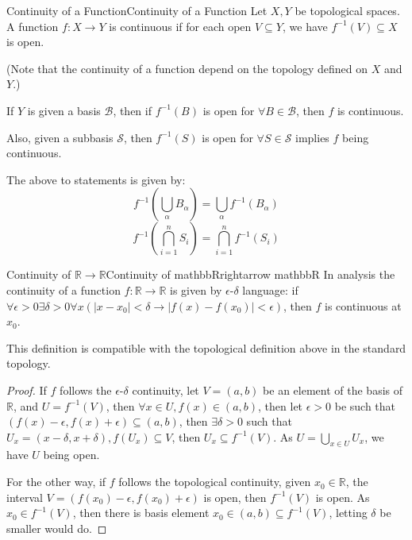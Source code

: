 \documentclass[../main.tex]{subfiles}
\begin{document}
\begin{definition}{Continuity of a Function}{Continuity of a Function}
Let $X,Y$ be topological spaces. A function $f: X \rightarrow Y$ is continuous if for each open $V \subseteq Y$, we have $f^{-1}(V)\subseteq X$ is open.

(Note that the continuity of a function depend on the topology defined on $X$ and $Y$.)
\end{definition}

\begin{remark}
If $Y$ is given a basis $\mathcal{B}$, then if $f^{-1}(B)$ is open for $\forall B\in \mathcal{B}$, then $f$ is continuous. 

Also, given a subbasis $\mathcal{S}$, then $f^{-1}(S)$ is open for $\forall S\in \mathcal{S}$ implies $f$ being continuous.

The above to statements is given by:
\begin{equation*}
f^{-1}(\bigcup_{\alpha} B_{\alpha}) = \bigcup_{\alpha} f^{-1}(B_{\alpha})
\end{equation*}
\begin{equation*}
f^{-1}(\bigcap_{i=1}^{n} S_i) = \bigcap_{i=1}^{n} f^{-1}(S_i)
\end{equation*}
\end{remark}

\begin{example}{Continuity of $\mathbb{R}\rightarrow \mathbb{R}$}{Continuity of mathbbRrightarrow mathbbR}
In analysis the continuity of a function $f: \mathbb{R}\rightarrow \mathbb{R}$ is given by $\epsilon$-$\delta$ language: if $\forall \epsilon>0 \exists \delta>0 \forall x (\left|x-x_0\right|<\delta \rightarrow \left|f(x)-f(x_0)\right|<\epsilon)$, then $f$ is continuous at $x_0$.

This definition is compatible with the topological definition above in the standard topology.
\begin{proof}
If $f$ follows the $\epsilon$-$\delta$ continuity, let $V = (a,b)$ be an element of the basis of $\mathbb{R}$, and $U = f^{-1}(V)$, then $\forall x\in U, f(x)\in (a,b)$, then let $\epsilon>0$ be such that $(f(x)-\epsilon,f(x)+\epsilon) \subseteq (a,b)$, then $\exists \delta>0$ such that $U_x = (x-\delta,x+\delta),f(U_x) \subseteq V$, then $U_x \subseteq f^{-1}(V)$. As $U = \bigcup_{x\in U} U_x$, we have $U$ being open.

For the other way, if $f$ follows the topological continuity, given  $x_0\in \mathbb{R}$, the interval $V = (f(x_0)-\epsilon,f(x_0)+\epsilon)$ is open, then $f^{-1}(V)$ is open. As $x_0\in f^{-1}(V)$, then there is basis element $x_0\in (a,b) \subseteq f^{-1}(V)$, letting $\delta$ be smaller would do.
\end{proof}
\end{example}
\end{document}
